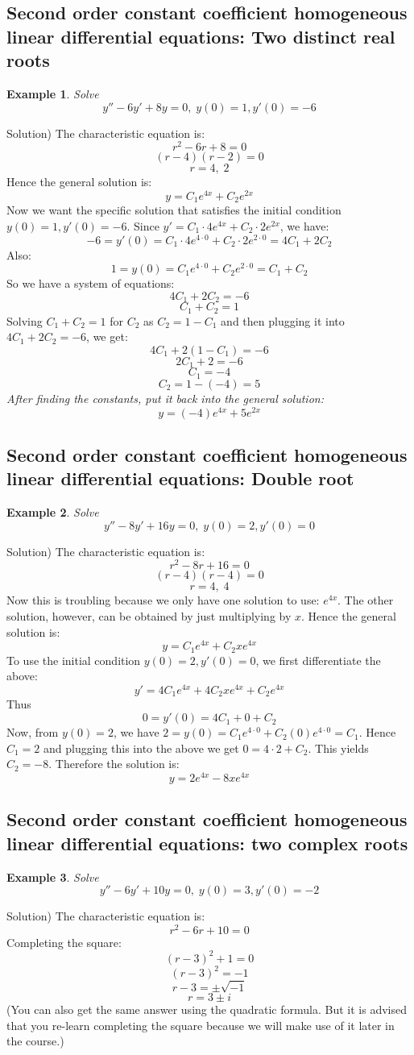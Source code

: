 \documentclass[12pt]{report}
\newtheorem{ex}{Example}[section]
\begin{document}
\subsection*{Second order constant coefficient homogeneous linear differential equations: Two distinct real roots}

\begin{ex} Solve
$$y''-6y'+8y=0, \; y(0)=1, y'(0)=-6$$
\end{ex}
Solution) The characteristic equation is:
$$r^2 -6r +8=0$$
$$(r-4)(r-2)=0$$
$$r=4, \; 2$$
Hence the general solution is:
$$ y=C_1 e^{4 x}+ C_2 e^{2 x}$$
Now we want the specific solution that satisfies the initial condition $y(0)=1, y'(0)=-6$. Since $y' = C_1 \cdot 4 e^{4 x}+ C_2 \cdot 2 e^{2 x}$, we have:
$$-6 = y'(0) = C_1 \cdot 4 e^{4\cdot 0}+ C_2 \cdot 2 e^{2 \cdot 0} = 4C_1+ 2C_2 $$
Also:
$$1=y(0)= C_1 e^{4\cdot 0}+ C_2 e^{2 \cdot 0} = C_1+ C_2 $$
So we have a system of equations:
$$4C_1 + 2C_2 = -6$$
$$C_1 + C_2 = 1$$
Solving $C_1 + C_2 = 1$ for $C_2$ as $C_2 = 1-C_1$ and then plugging it into $4C_1 + 2C_2 = -6$, we get:
$$4C_1 + 2(1-C_1) = -6$$
$$2 C_1 + 2 = -6$$
$$C_1 = -4$$
$$C_2 = 1-(-4)=5$$
\textit{After finding the constants, put it back into the general solution:}
$$y = (-4) e^{4 x}+ 5 e^{2 x}$$

\subsection*{ Second order constant coefficient homogeneous linear differential equations: Double root}
\begin{ex} Solve
$$y''-8y'+16y=0, \; y(0)=2, y'(0)=0$$
\end{ex}
Solution) The characteristic equation is:
$$r^2 -8r +16=0$$
$$(r-4)(r-4)=0$$
$$r=4, \; 4$$
Now this is troubling because we only have one solution to use: $e^{4 x}$. The other solution, however, can be obtained by just multiplying by $x$. Hence the general solution is:
$$ y=C_1 e^{4 x}+ C_2 x e^{4 x}$$
To use the initial condition $y(0)=2, y'(0)=0$, we first differentiate the above:
$$y' = 4C_1 e^{4 x}+ 4C_2 x e^{4 x}+C_2 e^{4 x}$$
Thus
$$0 = y'(0)=4C_1+0+C_2$$
Now, from $y(0)=2$, we have $2=y(0)=C_1 e^{4 \cdot 0}+ C_2 (0) e^{4 \cdot 0} = C_1$. Hence $C_1=2$ and plugging this into the above we get $0=4\cdot 2 + C_2$. This yields $C_2=-8$. Therefore the solution is:
$$y= 2 e^{4 x} - 8 x e^{4 x}$$

\subsection*{ Second order constant coefficient homogeneous linear differential equations: two complex roots}
\begin{ex} Solve
$$y''-6y'+10y=0, \; y(0)=3, y'(0)=-2$$
\end{ex}
Solution) The characteristic equation is:
$$r^2 -6r +10=0$$
Completing the square:
$$(r-3)^2 +1=0$$
$$(r-3)^2 = -1$$
$$r-3 = \pm \sqrt{-1}$$
$$r = 3\pm i$$
(You can also get the same answer using the quadratic formula. But it is advised that you re-learn completing the square because we will make use of it later in the course.)
\end{document}
